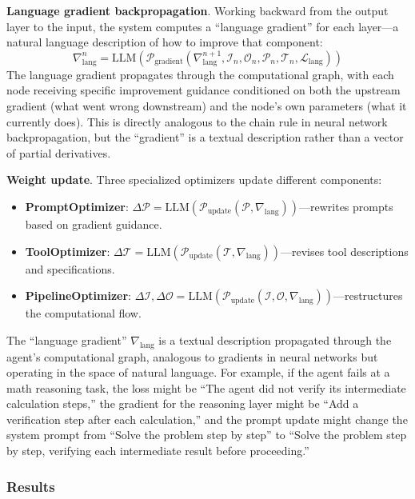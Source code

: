 \textbf{Language gradient backpropagation}. Working backward from the output layer to the input, the system computes a ``language gradient'' for each layer---a natural language description of how to improve that component:
\begin{equation}
\nabla_{\text{lang}}^n = \text{LLM}(\mathcal{P}_{\text{gradient}}(\nabla_{\text{lang}}^{n+1}, \mathcal{I}_n, \mathcal{O}_n, \mathcal{P}_n, \mathcal{T}_n, \mathcal{L}_{\text{lang}}))
\end{equation}
The language gradient propagates through the computational graph, with each node receiving specific improvement guidance conditioned on both the upstream gradient (what went wrong downstream) and the node's own parameters (what it currently does). This is directly analogous to the chain rule in neural network backpropagation, but the ``gradient'' is a textual description rather than a vector of partial derivatives.

\textbf{Weight update}. Three specialized optimizers update different components:
\begin{itemize}
\item \textbf{PromptOptimizer}: $\Delta\mathcal{P} = \text{LLM}(\mathcal{P}_{\text{update}}(\mathcal{P}, \nabla_{\text{lang}}))$---rewrites prompts based on gradient guidance.
\item \textbf{ToolOptimizer}: $\Delta\mathcal{T} = \text{LLM}(\mathcal{P}_{\text{update}}(\mathcal{T}, \nabla_{\text{lang}}))$---revises tool descriptions and specifications.
\item \textbf{PipelineOptimizer}: $\Delta\mathcal{I}, \Delta\mathcal{O} = \text{LLM}(\mathcal{P}_{\text{update}}(\mathcal{I}, \mathcal{O}, \nabla_{\text{lang}}))$---restructures the computational flow.
\end{itemize}

The ``language gradient'' $\nabla_{\text{lang}}$ is a textual description propagated through the agent's computational graph, analogous to gradients in neural networks but operating in the space of natural language. For example, if the agent fails at a math reasoning task, the loss might be ``The agent did not verify its intermediate calculation steps,'' the gradient for the reasoning layer might be ``Add a verification step after each calculation,'' and the prompt update might change the system prompt from ``Solve the problem step by step'' to ``Solve the problem step by step, verifying each intermediate result before proceeding.''

\subsubsection{Results}

